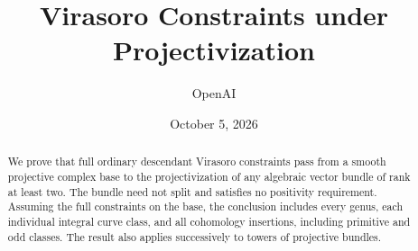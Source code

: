 \documentclass[11pt]{article}
\title{Virasoro Constraints under Projectivization}
\author{OpenAI}
\date{October 5, 2026}
\begin{document}
\maketitle
\begin{abstract}
We prove that full ordinary descendant Virasoro constraints pass from a
smooth projective complex base to the projectivization of any algebraic
vector bundle of rank at least two. The bundle need not split and satisfies
no positivity requirement. Assuming the full constraints on the base, the
conclusion includes every genus, each individual integral curve class, and
all cohomology insertions, including primitive and odd classes. The result
also applies successively to towers of projective bundles.
\end{abstract}
\tableofcontents









\end{document}
